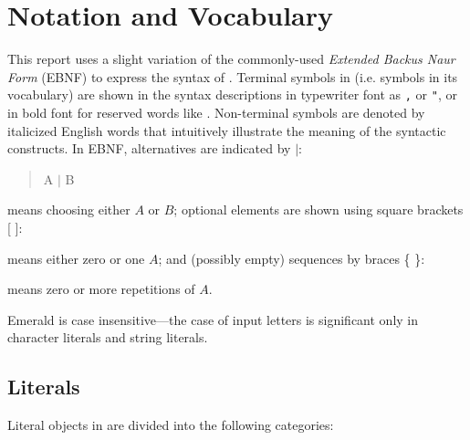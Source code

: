 \section{Notation and Vocabulary}
\label{lexical considerations}
This report uses a slight variation of the commonly-used {\em Extended Backus 
Naur Form} (EBNF) to express the syntax of \emd{}.
Terminal symbols in \emd{} (i.e. symbols in its vocabulary)
are shown in the syntax descriptions in typewriter font as {\tt ,} or
{\tt "}, or in bold font for reserved words like
.  
Non-terminal symbols are denoted by italicized English words
that intuitively illustrate the meaning of the syntactic constructs.
In EBNF, alternatives are indicated by $|$:
\begin{quote}A $|$ B\end{quote}
means choosing either $A$ or $B$; optional elements are shown using
square brackets [ ]:
\begin{quote}\end{quote}

means either zero or one $A$; and (possibly empty) sequences by
braces \{ \}:
\begin{quote}\end{quote}

means zero or more repetitions of $A$.

Emerald is case insensitive---the case of input letters is significant only
in character literals and string literals.

\subsection{Literals}
Literal objects in \emd{} are divided into the following categories:

